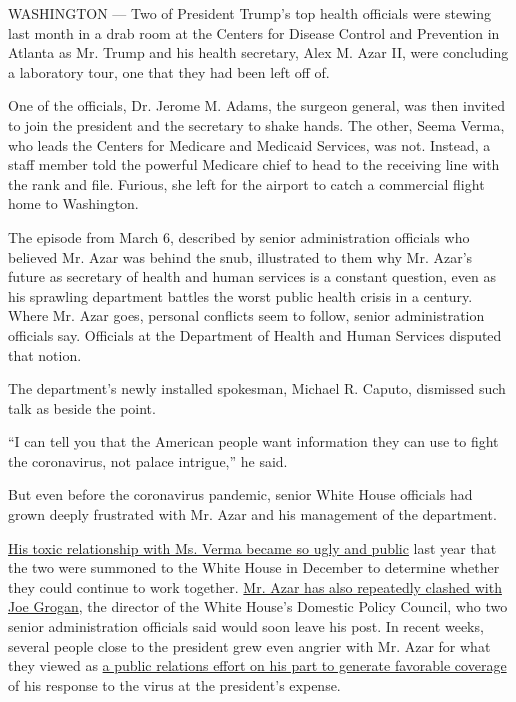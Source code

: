 WASHINGTON --- Two of President Trump's top health officials were
stewing last month in a drab room at the Centers for Disease Control and
Prevention in Atlanta as Mr. Trump and his health secretary, Alex M.
Azar II, were concluding a laboratory tour, one that they had been left
off of.

One of the officials, Dr. Jerome M. Adams, the surgeon general, was then
invited to join the president and the secretary to shake hands. The
other, Seema Verma, who leads the Centers for Medicare and Medicaid
Services, was not. Instead, a staff member told the powerful Medicare
chief to head to the receiving line with the rank and file. Furious, she
left for the airport to catch a commercial flight home to Washington.

The episode from March 6, described by senior administration officials
who believed Mr. Azar was behind the snub, illustrated to them why Mr.
Azar's future as secretary of health and human services is a constant
question, even as his sprawling department battles the worst public
health crisis in a century. Where Mr. Azar goes, personal conflicts seem
to follow, senior administration officials say. Officials at the
Department of Health and Human Services disputed that notion.

The department's newly installed spokesman, Michael R. Caputo, dismissed
such talk as beside the point.

``I can tell you that the American people want information they can use
to fight the coronavirus, not palace intrigue,'' he said.

But even before the coronavirus pandemic, senior White House officials
had grown deeply frustrated with Mr. Azar and his management of the
department.

\href{https://www.nytimes3xbfgragh.onion/2019/12/10/us/politics/trump-seema-verma-azar.html}{His
toxic relationship with Ms. Verma became so ugly and public} last year
that the two were summoned to the White House in December to determine
whether they could continue to work together.
\href{https://www.nytimes3xbfgragh.onion/2019/07/11/health/drug-prices-rebate-donald-trump.html}{Mr.
Azar has also repeatedly clashed with Joe Grogan}, the director of the
White House's Domestic Policy Council, who two senior administration
officials said would soon leave his post. In recent weeks, several
people close to the president grew even angrier with Mr. Azar for what
they viewed as
\href{https://www.nytimes3xbfgragh.onion/2020/03/07/us/politics/trump-coronavirus.html}{a
public relations effort on his part to generate favorable coverage} of
his response to the virus at the president's expense.

